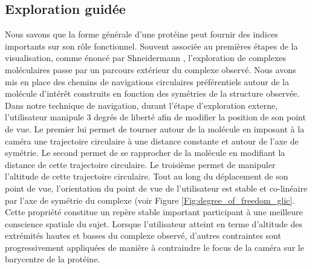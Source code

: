 

\subsection{Exploration guidée}

Nous savons que la forme générale d'une protéine peut fournir des indices importants sur son rôle fonctionnel. %
Souvent associée au premières étapes de la visualisation, comme énoncé par Shneidermann \cite{shneiderman_eyes_1996}, l'exploration de complexes moléculaires passe par un parcours extérieur du complexe observé. Nous avons mis en place des chemins de navigations circulaires préférentiels autour de la molécule d'intérêt construits en fonction des symétries de la structure observée. 
Dans notre technique de navigation, durant l'étape d'exploration externe, l'utilisateur manipule 3 degrés de liberté afin de modifier la position de son point de vue. Le premier lui permet de tourner autour de la molécule en imposant à la caméra une trajectoire circulaire à une distance constante et autour de l'axe de symétrie. Le second permet de se rapprocher de la molécule en modifiant la distance de cette trajectoire circulaire. Le troisième permet de manipuler l'altitude de cette trajectoire circulaire. Tout au long du déplacement de son point de vue, l'orientation du point de vue de l'utilisateur est stable et co-linéaire par l'axe de symétrie du complexe (voir Figure \ref{Fig:degree_of_freedom_glic}. Cette propriété constitue un repère stable important participant à une meilleure conscience spatiale du sujet. Lorsque l'utilisateur atteint en terme d'altitude des extrémités hautes et basses du complexe observé, d'autres contraintes sont progressivement appliquées de manière à contraindre le focus de la caméra sur le barycentre de la protéine.

